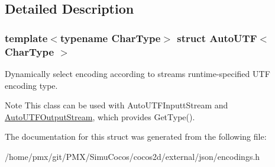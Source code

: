 \subsection{Detailed Description}
\subsubsection*{template$<$typename Char\+Type$>$\newline
struct Auto\+U\+T\+F$<$ Char\+Type $>$}

Dynamically select encoding according to stream\textquotesingle{}s runtime-\/specified U\+TF encoding type. 

\begin{DoxyNote}{Note}
This class can be used with Auto\+U\+T\+F\+Inputt\+Stream and \hyperlink{classAutoUTFOutputStream}{Auto\+U\+T\+F\+Output\+Stream}, which provides Get\+Type(). 
\end{DoxyNote}


The documentation for this struct was generated from the following file\+:\begin{DoxyCompactItemize}
\item 
/home/pmx/git/\+P\+M\+X/\+Simu\+Cocos/cocos2d/external/json/encodings.\+h\end{DoxyCompactItemize}

